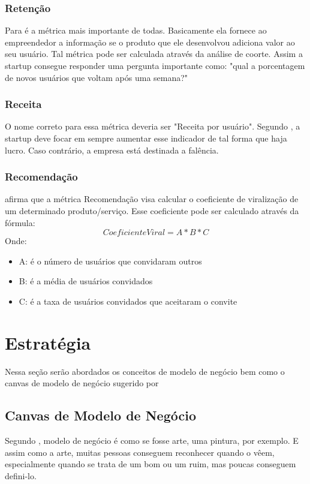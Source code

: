 \subsubsection{Retenção}
\label{cha:retencao}
Para  é a métrica mais importante de todas. Basicamente ela fornece ao empreendedor a informação se o produto que ele desenvolvou adiciona valor ao seu usuário. Tal métrica pode ser calculada através da análise de coorte. Assim a startup consegue responder uma pergunta importante como: "qual a porcentagem de novos usuários que voltam após uma semana?"

\subsubsection{Receita}
\label{cha:receita}
O nome correto para essa métrica deveria ser "Receita por usuário". Segundo , a startup deve focar em sempre aumentar esse indicador de tal forma que haja lucro. Caso contrário, a empresa está destinada a falência.

\subsubsection{Recomendação}
\label{cha:recomendacao}
 afirma que a métrica Recomendação visa calcular o coeficiente de viralização de um determinado produto/serviço. Esse coeficiente pode ser calculado através da fórmula: 
\begin{equation}
CoeficienteViral = A * B * C
\end{equation}
Onde:
\begin{itemize}
\item A: é o número de usuários que convidaram outros
\item B: é a média de usuários convidados
\item C: é a taxa de usuários convidados que aceitaram o convite
\end{itemize}

\section{Estratégia}
\label{cha:estrategia}
Nessa seção serão abordados os conceitos de modelo de negócio bem como o canvas de modelo de negócio sugerido por 

\subsection{Canvas de Modelo de Negócio}
\label{cha:canvas_de_modelo_de_negocio}
Segundo , modelo de negócio é como se fosse arte, uma pintura, por exemplo. E assim como a arte, muitas pessoas conseguem reconhecer quando o vêem, especialmente quando se trata de um bom ou um ruim, mas poucas conseguem defini-lo.

